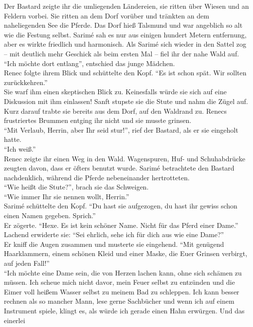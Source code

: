 Der Bastard zeigte ihr die umliegenden Ländereien, sie ritten über Wiesen und an Feldern vorbei. 
Sie ritten an dem Dorf vorüber und tränkten an dem naheliegenden See die Pferde. Das Dorf hieß 
Talsmund und war angeblich so alt wie die Festung selbst. Sarimé sah es nur aus einigen hundert 
Metern entfernung, aber es wirkte friedlich und harmonisch. Als Sarimé sich wieder in den Sattel 
zog – mit deutlich mehr Geschick als beim ersten Mal – fiel ihr der nahe Wald auf. ``Ich möchte 
dort entlang'', entschied das junge Mädchen.\\
Renec folgte ihrem Blick und schüttelte den Kopf. ``Es ist schon spät. Wir sollten zurückkehren.''\\
Sie warf ihm einen skeptischen Blick zu. Keinesfalls würde sie sich auf eine Diskussion mit ihm 
einlassen! Sanft stupste sie die Stute und nahm die Zügel auf. Kurz darauf trabte sie bereits aus 
dem Dorf, auf den Waldrand zu. Renecs frustriertes Brummen entging ihr nicht und sie musste 
grinsen.\\
``Mit Verlaub, Herrin, aber Ihr seid stur!'', rief der Bastard, als er sie eingeholt hatte.\\
``Ich weiß.''\\
Renec zeigte ihr einen Weg in den Wald. Wagenspuren, Huf- und Schuhabdrücke zeugten davon, dass er 
öfters benutzt wurde. Sarimé betrachtete den Bastard nachdenklich, während die Pferde nebeneinander 
hertrotteten.\\
``Wie heißt die Stute?'', brach sie das Schweigen.\\
``Wie immer Ihr sie nennen wollt, Herrin.''\\
Sarimé schüttelte den Kopf. ``Du hast sie aufgezogen, du hast ihr gewiss schon einen Namen gegeben. 
Sprich.''\\
Er zögerte. ``Hexe. Es ist kein schöner Name. Nicht für das Pferd einer Dame.''\\
Lachend erwiderte sie: ``Sei ehrlich, sehe ich für dich aus wie eine Dame?''\\
Er kniff die Augen zusammen und musterte sie eingehend. ``Mit genügend Haarklammern, einem schönen 
Kleid und einer Maske, die Euer Grinsen verbirgt, auf jeden Fall!''\\
``Ich möchte eine Dame sein, die von Herzen lachen kann, ohne sich schämen zu müssen. Ich scheue 
mich nicht davor, mein Feuer selbst zu entzünden und die Eimer voll heißem Wasser selbst zu meinem 
Bad zu schleppen. Ich kann besser rechnen als so mancher Mann, lese gerne Sachbücher und wenn ich 
auf einem Instrument spiele, klingt es, als würde ich gerade einen Hahn erwürgen. Und das einerlei 
